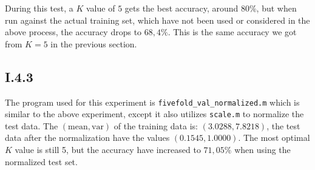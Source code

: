 During this test, a $K$ value of $5$ gets the best accuracy, around 80\%, but
when run against the actual training set, which have not been used or considered
in the above process, the accuracy drops to $68,4\%$. This is the same accuracy
we got from $K=5$ in the previous section.

\subsection{I.4.3}
The program used for this experiment is \texttt{fivefold_val_normalized.m} which
is similar to the above experiment, except it also utilizes \texttt{scale.m} to
normalize the test data.  The $(\text{mean},\text{var})$ of the training data
is: $(3.0288,7.8218)$, the test data after the normalization have the values
$(0.1545,1.0000)$. The most optimal $K$ value is still 5, but the accuracy have
increased to $71,05\%$ when using the normalized test set.

